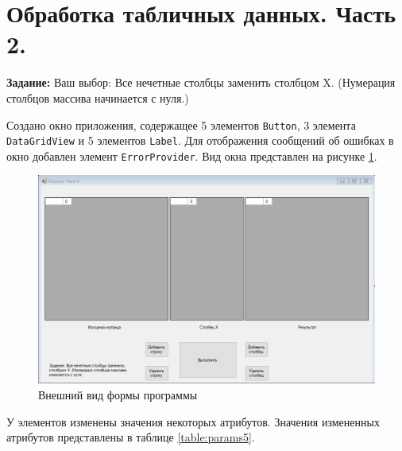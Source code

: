\section{Обработка табличных данных. Часть 2.}

\textbf{Задание:} Ваш выбор: Все нечетные столбцы заменить столбцом X. 
(Нумерация столбцов массива начинается с нуля.)

Создано окно приложения, содержащее 5 элементов \verb|Button|, 3 элемента \verb|DataGridView| 
и 5 элементов \verb|Label|. 
Для отображения сообщений об ошибках в окно добавлен элемент \verb|ErrorProvider|. 
Вид окна представлен на рисунке \ref{fig:task5_form}.
\begin{figure}[H]
    \centering
    \includegraphics[scale=0.6]{task5/form.png}
    \caption{Внешний вид формы программы}
    \label{fig:task5_form}
\end{figure}
У элементов изменены значения некоторых атрибутов. 
Значения измененных атрибутов представлены в таблице \ref{table:params5}.
